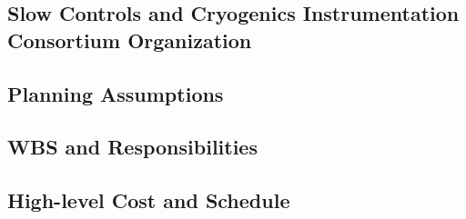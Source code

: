 
\subsection{Slow Controls and Cryogenics Instrumentation Consortium Organization}
\label{sec:fddp-slow-cryo-org-consortium}


\subsection{Planning Assumptions}
\label{sec:fddp-slow-cryo-org-assmp}


\subsection{WBS and Responsibilities}
\label{sec:fddp-slow-cryo-org-wbs}

\subsection{High-level Cost and Schedule}
\label{sec:fddp-slow-cryo-org-cs}


